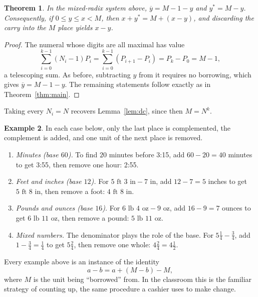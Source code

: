 \documentclass[11pt]{amsart}
\newtheorem{theorem}{Theorem}[section]
\theoremstyle{definition}
\newtheorem{example}[theorem]{Example}
\theoremstyle{remark}
\newcommand{\dc}[1]{\overline{#1}}   %
\newcommand{\rc}[1]{#1^{\ast}}       %
\begin{document}
\begin{theorem}\label{thm:mixed}
In the mixed-radix system above, $\dc{y} = M - 1 - y$ and $\rc{y} = M - y$.
Consequently, if $0 \le y \le x < M$, then $x + \rc{y} = M + (x - y)$, and
discarding the carry into the $M$ place yields $x - y$.
\end{theorem}

\begin{proof}
The numeral whose digits are all maximal has value
\[
  \sum_{i=0}^{k-1} (N_i - 1)P_i = \sum_{i=0}^{k-1} (P_{i+1} - P_i) = P_k - P_0 = M - 1,
\]
a telescoping sum. As before, subtracting $y$ from it requires no borrowing,
which gives $\dc{y} = M - 1 - y$. The remaining statements follow exactly as in
Theorem~\ref{thm:main}.
\end{proof}

Taking every $N_i = N$ recovers Lemma~\ref{lem:dc}, since then $M = N^k$.

\begin{example}
In each case below, only the last place is complemented, the complement is added,
and one unit of the next place is removed.
\begin{enumerate}
\item \emph{Minutes (base $60$).} To find $20$ minutes before 3:15, add
  $60 - 20 = 40$ minutes to get 3:55, then remove one hour: 2:55.
\item \emph{Feet and inches (base $12$).} For $5\text{ ft }3\text{ in} - 7\text{ in}$,
  add $12 - 7 = 5$ inches to get $5\text{ ft }8\text{ in}$, then remove a foot:
  $4\text{ ft }8\text{ in}$.
\item \emph{Pounds and ounces (base $16$).} For
  $6\text{ lb }4\text{ oz} - 9\text{ oz}$, add $16 - 9 = 7$ ounces to get
  $6\text{ lb }11\text{ oz}$, then remove a pound: $5\text{ lb }11\text{ oz}$.
\item \emph{Mixed numbers.} The denominator plays the role of the base. For
  $5\tfrac14 - \tfrac34$, add $1 - \tfrac34 = \tfrac14$ to get $5\tfrac24$, then
  remove one whole: $4\tfrac24 = 4\tfrac12$.
\end{enumerate}
\end{example}

Every example above is an instance of the identity
\[
  a - b = a + (M - b) - M,
\]
where $M$ is the unit being ``borrowed'' from. In the classroom this is the
familiar strategy of counting up, the same procedure a cashier uses to make
change.
\end{document}
